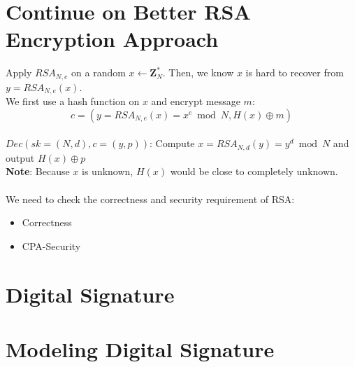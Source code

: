 \documentclass{scribe}
\begin{document}
\maketitle


\section{Continue on Better RSA Encryption Approach}
Apply $RSA_{N,e}$ on a random $x \leftarrow \mathbf{Z}_N^*$. Then, we know $x$ is hard to recover from $y=RSA_{N,e}(x)$.
\\
We first use a hash function on $x$ and encrypt message $m$:
\[c = (y=RSA_{N,e}(x) = x^e \bmod N, H(x) \oplus m)\]  
\\
$Dec(sk=(N,d), c=(y,p))$: Compute $x=RSA_{N,d}(y) = y ^d \bmod N$ and output $H(x) \oplus p$
\\
\textbf{Note}: Because $x$ is unknown, $H(x)$ would be close to completely unknown.
\\\\
We need to check the correctness and security requirement of RSA:
\begin{itemize}
    \item Correctness\\
            
    \item CPA-Security\\
\end{itemize}
\vspace{10mm}
\section{Digital Signature}

\vspace{10mm}
\section{Modeling Digital Signature}

\vspace{10mm}
\end{document}
